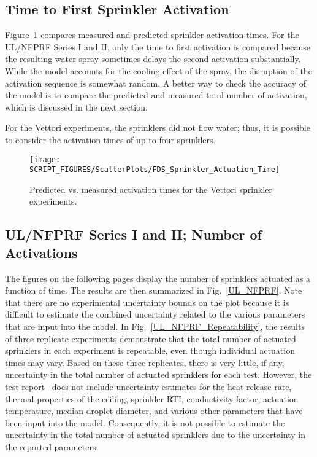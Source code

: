 \subsection{Time to First Sprinkler Activation}

Figure~\ref{Sprinkler_Activation_Times} compares measured and predicted sprinkler activation times. For the UL/NFPRF Series I and II, only the time to first activation is compared because the resulting water spray sometimes delays the second activation substantially. While the model accounts for the cooling effect of the spray, the disruption of the activation sequence is somewhat random. A better way to check the accuracy of the model is to compare the predicted and measured total number of activation, which is discussed in the next section.

For the Vettori experiments, the sprinklers did not flow water; thus, it is possible to consider the activation times of up to four sprinklers.

\begin{figure}[h]
\begin{center}
\texttt{[image: SCRIPT\_FIGURES/ScatterPlots/FDS\_Sprinkler\_Actuation\_Time]}
\end{center}
\caption[Activation times for the Vettori sprinkler experiments]{Predicted vs. measured activation times for the Vettori sprinkler experiments.}
\label{Sprinkler_Activation_Times}
\end{figure}


\clearpage

\subsection{UL/NFPRF Series I and II; Number of Activations}
\label{UL_NFPRF:Results}

The figures on the following pages display the number of sprinklers actuated as a function of time. The results are then summarized in Fig.~\ref{UL_NFPRF}. Note that there are no experimental uncertainty bounds on the plot because it is difficult to estimate the combined uncertainty related to the various parameters that are input into the model. In Fig.~\ref{UL_NFPRF_Repeatability}, the results of three replicate experiments demonstrate that the total number of actuated sprinklers in each experiment is repeatable, even though individual actuation times may vary. Based on these three replicates, there is very little, if any, uncertainty in the total number of actuated sprinklers for each test. However, the test report~\cite{Sheppard:1} does not include uncertainty estimates for the heat release rate, thermal properties of the ceiling, sprinkler RTI, conductivity factor, actuation temperature, median droplet diameter, and various other parameters that have been input into the model. Consequently, it is not possible to estimate the uncertainty in the total number of actuated sprinklers due to the uncertainty in the reported parameters.

